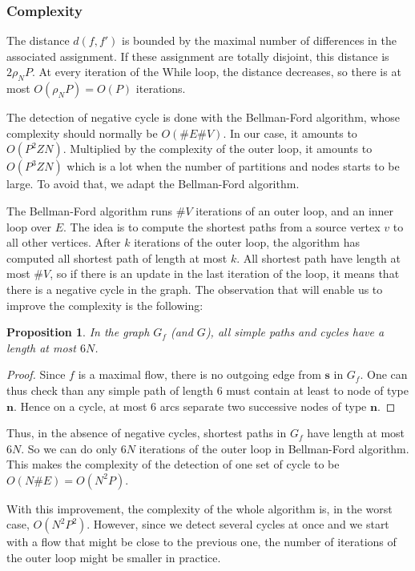 \documentclass[]{article}
\newtheorem{proposition}{Proposition}
\begin{document}
\subsubsection*{Complexity}
The distance $d(f,f')$ is bounded by the maximal number of differences in the associated assignment. If these assignment are totally disjoint, this distance is $2\rho_N P$. At every iteration of the While loop, the distance decreases, so there is at most $O(\rho_N P) = O(P)$ iterations.

The detection of negative cycle is done with the Bellman-Ford algorithm, whose complexity should normally be $O(\#E\#V)$. In our case, it amounts to $O(P^2ZN)$. Multiplied by the complexity of the outer loop, it amounts to $O(P^3ZN)$ which is a lot when the number of partitions and nodes starts to be large. To avoid that, we adapt the Bellman-Ford algorithm.

The Bellman-Ford algorithm runs $\#V$ iterations of an outer loop, and an inner loop over $E$. The idea is to compute the shortest paths from a source vertex $v$ to all other vertices. After $k$ iterations of the outer loop, the algorithm has computed all shortest path of length at most $k$. All shortest path have length at most $\#V$, so if there is an update in the last iteration of the loop, it means that there is a negative cycle in the graph. The observation that will enable us to improve the complexity is the following:

\begin{proposition}
	In the graph $G_f$ (and $G$), all simple paths and cycles have a length at most $6N$.
\end{proposition}
\begin{proof}
	Since $f$ is a maximal flow, there is no outgoing edge from $\mathbf{s}$ in $G_f$. One can thus check than any simple path of length 6 must contain at least to node of type $\mathbf{n}$. Hence on a cycle, at most 6 arcs separate two successive nodes of type $\mathbf{n}$. 
\end{proof}

Thus, in the absence of negative cycles, shortest paths in $G_f$ have length at most $6N$. So we can do only $6N$ iterations of the outer loop in Bellman-Ford algorithm. This makes the complexity of the detection of one set of cycle to be $O(N\#E) = O(N^2 P)$.

With this improvement, the complexity of the whole algorithm is, in the worst case, $O(N^2P^2)$. However, since we detect several cycles at once and we start with a flow that might be close to the previous one, the number of iterations of the outer loop might be smaller in practice.
\end{document}
